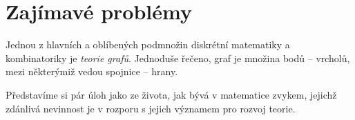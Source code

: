 \section{Zajímavé problémy}
\label{sec:zajimave-problemy}

Jednou z hlavních a oblíbených podmnožin diskrétní matematiky a kombinatoriky
je \emph{teorie grafů}. Jednoduše řečeno, graf je množina bodů -- vrcholů, mezi
některýmiž vedou spojnice -- hrany.

Představíme si pár úloh jako ze života, jak bývá v matematice zvykem, jejichž
zdánlivá nevinnost je v rozporu s jejich významem pro rozvoj teorie.



